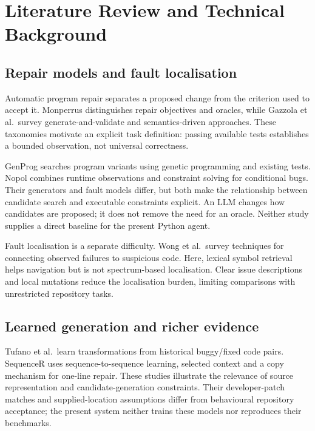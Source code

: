 \chapter{Literature Review and Technical Background}\label{chap:2}

\section{Repair models and fault localisation}\label{sec:2.1}

Automatic program repair separates a proposed change from the criterion used to accept it. Monperrus distinguishes repair objectives and oracles, while Gazzola et al.~survey generate-and-validate and semantics-driven approaches. These taxonomies motivate an explicit task definition: passing available tests establishes a bounded observation, not universal correctness. \citep{monperrus2018repair, gazzola2019survey}

GenProg searches program variants using genetic programming and existing tests. Nopol combines runtime observations and constraint solving for conditional bugs. Their generators and fault models differ, but both make the relationship between candidate search and executable constraints explicit. An LLM changes how candidates are proposed; it does not remove the need for an oracle. Neither study supplies a direct baseline for the present Python agent. \citep{legoues2012genprog, xuan2017nopol}

Fault localisation is a separate difficulty. Wong et al.~survey techniques for connecting observed failures to suspicious code. Here, lexical symbol retrieval helps navigation but is not spectrum-based localisation. Clear issue descriptions and local mutations reduce the localisation burden, limiting comparisons with unrestricted repository tasks. \citep{wong2016localization}

\section{Learned generation and richer evidence}\label{sec:2.2}

Tufano et al.~learn transformations from historical buggy/fixed code pairs. SequenceR uses sequence-to-sequence learning, selected context and a copy mechanism for one-line repair. These studies illustrate the relevance of source representation and candidate-generation constraints. Their developer-patch matches and supplied-location assumptions differ from behavioural repository acceptance; the present system neither trains these models nor reproduces their benchmarks. \citep{tufano2019neuralrepair, chen2021sequencer}

